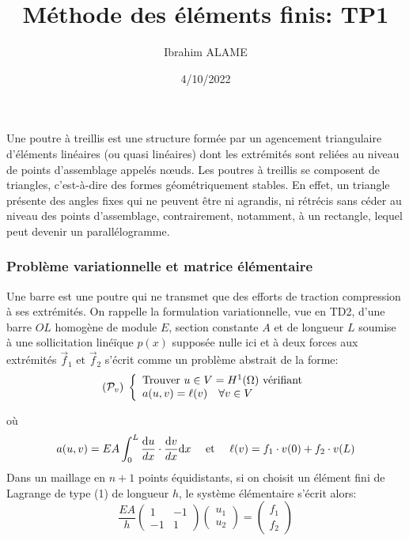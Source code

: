 \documentclass[11pt]{article}
\title{Méthode des éléments finis: TP1}
\author{Ibrahim ALAME}
\date{4/10/2022}
\def \de {{\rm d}}
\begin{document}
\maketitle
  
  
  Une poutre à treillis est une structure formée par un agencement triangulaire d'éléments linéaires (ou quasi linéaires) dont les extrémités sont reliées au niveau de points d'assemblage appelés nœuds. Les poutres à treillis se composent de triangles, c'est-à-dire des formes géométriquement stables. En effet, un triangle présente des angles fixes qui ne peuvent être ni agrandis, ni rétrécis sans céder au niveau des points d'assemblage, contrairement, notamment, à un rectangle, lequel peut devenir un parallélogramme.
\subsubsection*{Problème variationnelle et matrice élémentaire}
Une barre est une poutre qui ne transmet que des efforts de traction compression à ses extrémités. On rappelle la formulation variationnelle, vue en TD2,  d'une barre $OL$ homogène de module $E$, section constante $A$ et de longueur $L$ soumise à une sollicitation linéïque  $p(x)$ supposée nulle ici et à deux forces aux extrémités $\vec{f}_1$ et $\vec{f}_2$ s'écrit comme un problème abstrait de la forme:
\[
({\cal P}_v)\;\left\{
\begin{array}{l}
\mbox{Trouver } u\in V=H^1(\Omega) \mbox{ vérifiant}\\
a(u,v)=\ell(v)\quad \forall v\in V
\end{array}
\right.
\]

où \[ a(u,v)=\displaystyle EA\int_0^L\frac{\de u}{dx}\cdot \frac{\de v}{dx}\de x\quad \mbox{ et }\quad \ell(v)=f_1 \cdot v(0)+f_2 \cdot v(L)\]
Dans un maillage en $n+1$ points équidistants, si on choisit un élément fini de Lagrange de type (1) de longueur $h$, le système élémentaire s'écrit alors:
\[\frac{EA}{h}\left(\begin{array}{rr} 
1&-1\\-1&1
\end{array}\right) \left(\begin{array}{l} 
u_{1}\\u_{2}
\end{array}\right)=\left(\begin{array}{r} 
f_{1}\\f_{2}
\end{array}\right)
\]
\end{document}
